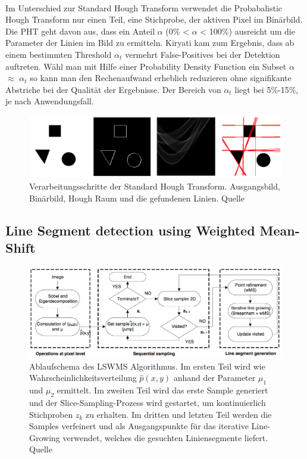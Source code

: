 \paragraph{}
Im Unterschied zur Standard Hough Transform verwendet die Probabalistic Hough Transform nur einen Teil, eine Stichprobe, der aktiven Pixel im Binärbild. Die PHT geht davon aus, dass ein Anteil $\alpha$ (0\% < $\alpha$ < 100\%) ausreicht um die Parameter der Linien im Bild zu ermitteln. Kiryati kam zum Ergebnis, dass ab einem bestimmten Threshold $\alpha_t$ vermehrt False-Positives bei der Detektion auftreten. Wähl man mit Hilfe einer Probability Density Function ein Subset $\alpha$ $\approx$ $\alpha_t$ so kann man den Rechenaufwand erheblich reduzieren ohne signifikante Abstriche bei der Qualität der Ergebnisse. Der Bereich von $\alpha_t$ liegt bei 5\%-15\%, je nach Anwendungsfall.

\begin{figure}[!ht]
\centering
\includegraphics[scale=0.25]{images/hough-transform} 
\caption{Verarbeitungsschritte der Standard Hough Transform. Ausgangsbild, Binärbild, Hough Raum und die gefundenen Linien. Quelle \cite{kiryati}}
\label{fig:hough-transform}
\end{figure}

\pagebreak

\subsection{Line Segment detection using Weighted Mean-Shift}

\begin{figure}[!ht]
\centering
\includegraphics[width=\textwidth]{images/lswms} 
\caption{Ablaufschema des LSWMS Algorithmus. Im ersten Teil wird wie Wahrscheinlichkeitsverteilung $\hat{p}(x,y)$ anhand der Parameter $\mu_1$ und $\mu_2$ ermittelt. Im zweiten Teil wird das erste Sample generiert und der Slice-Sampling-Prozess wird gestartet, um kontinuierlich Stichproben $z_k$ zu erhalten. Im dritten und letzten Teil werden die Samples verfeinert und als Ausgangspunkte für das iterative Line-Growing verwendet, welches die gesuchten Liniensegmente liefert. Quelle \cite{nieto}}
\label{fig:lswms}
\end{figure}

